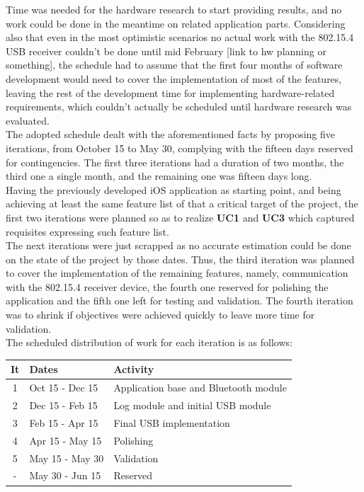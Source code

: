 			Time was needed for the hardware research to start providing results, and no work could be done in the meantime on related application parts. Considering also that even in the most optimistic scenarios no actual work with the 802.15.4 USB receiver couldn't be done until mid February [link to hw planning or something], the schedule had to assume that the first four months of software development would need to cover the implementation of most of the features, leaving the rest of the development time for implementing hardware-related requirements, which couldn't actually be scheduled until hardware research was evaluated.\\

			The adopted schedule dealt with the aforementioned facts by proposing five iterations, from October 15 to May 30, complying with the fifteen days reserved for contingencies. The first three iterations had a duration of two months, the third one a single month, and the remaining one was fifteen days long.\\

			Having the previously developed iOS application as starting point, and being achieving at least the same feature list of that a critical target of the project, the first two iterations were planned so as to realize \textbf{UC1} and \textbf{UC3} which captured requisites expressing such feature list.\\

			The next iterations were just scrapped as no accurate estimation could be done on the state of the project by those dates. Thus, the third iteration was planned to cover the implementation of the remaining features, namely, communication with the 802.15.4 receiver device, the fourth one reserved for polishing the application and the fifth one left for testing and validation. The fourth iteration was to shrink if objectives were achieved quickly to leave more time for validation.\\

			The scheduled distribution of work for each iteration is as follows:\\

			\begin{tabular}{| c | l | l |} %
				\hline
				It & Dates & Activity \\ \hline
				1 & Oct 15 - Dec 15 & Application base and Bluetooth module\\ \hline
				2 & Dec 15 - Feb 15 & Log module and initial USB module\\ \hline
				3 & Feb 15 - Apr 15 & Final USB implementation \\ \hline
				4 & Apr 15 - May 15 & Polishing \\ \hline
				5 & May 15 - May 30 & Validation \\ \hline
				- & May 30 - Jun 15 & Reserved \\
				\hline
			\end{tabular}\\\\

